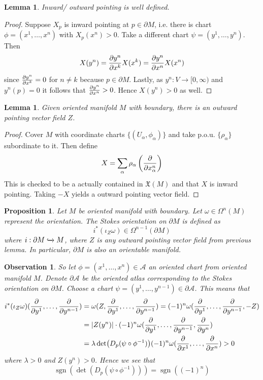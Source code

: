 \documentclass{article}
\numberwithin{theorem}{section}
\newtheorem{lemma}[theorem]{Lemma}
\newtheorem{proposition}[theorem]{Proposition}
\newtheorem{observation}{Observation}
\newcommand{\1}{\mathds{1}}
\DeclareMathOperator{\sgn}{sgn}
\begin{document}
\begin{lemma}
    Inward/ outward pointing is well defined. 
\end{lemma}
\begin{proof}
    Suppose $X_p$ is inward pointing at $p \in \partial M$, i.e. there is chart $\phi = (x^1, \dots, x^n)$ with $X_p(x^n) > 0$. Take a different chart $\psi = (y^1, \dots, y^n)$. Then 
    \[ X(y^n) = \pdv{y^n}{x^k} X(x^k) = \pdv{y^n}{x^n} X(x^n)  \]
    since $\pdv{y^n}{x^k} = 0 $ for $n\neq k$ because $p\in \partial M$. Lastly, as $y^n : V \to [0,\infty) $ and $y^n(p) = 0$ it follows that $\pdv{y^n}{x^n} > 0$. Hence $X(y^n) >0 $ as well. 
\end{proof}

\begin{lemma}
    Given oriented manifold $M$ with boundary, there is an outward pointing vector field $Z$. 
\end{lemma}
\begin{proof}
    Cover $M$ with coordinate charts $\{ (U_\alpha, \phi_\alpha) \}$ and take p.o.u. $\{\rho_\alpha \} $ subordinate to it. Then define 
    \[ X = \sum_{\alpha} \rho_\alpha \left( \pdv{}{x_\alpha^n} \right) \]
    This is checked to be a actually contained in $\mathfrak{X}(M)$ and that $X$ is inward pointing. Taking $-X$ yields a outward pointing vector field. 
\end{proof}

\begin{proposition}
    Let $M$ be oriented manifold with boundary. Let $\omega \in \Omega^n(M)$ represent the orientation. The 
    Stokes orientation on $\partial M$ is defined as 
    \[ i^*(\iota_Z\omega) \in \Omega^{n-1}(\partial M) \]
    where $i: \partial M \xhookrightarrow{} M$, where $Z$ is any outward pointing vector field from previous lemma. In particular, $\partial M$ is also an orientable manifold. 
\end{proposition}

\begin{observation}
    So let $\phi = (x^1, \dots, x^n) \in \mathcal{A}$ an oriented chart from oriented manifold $M$. Denote $\partial \mathcal{A}$ be the oriented atlas corresponding to the Stokes orientation on $\partial M$. Choose a chart $\psi = (y^1, \dots, y^{n-1}) \in \partial \mathcal{A}$. This means that 
    \begin{align*}
        i^*(\iota_Z\omega)( \pdv{}{y^1}, \dots, \pdv{}{y^{n-1}})  &= \omega(Z, \pdv{}{y^1}, \dots, \pdv{}{y^{n-1}})  = (-1)^n \omega(\pdv{}{y^1}, \dots, \pdv{}{y^{n-1}}, -Z) \\ 
        &= |Z(y^n)| \cdot (-1)^n \omega(\pdv{}{y^1}, \dots, \pdv{}{y^{n-1}}, \pdv{}{y^n}) \\
        &= \lambda \det(D_p(\psi \circ \phi^{-1})) (-1)^n \omega(\pdv{}{x^1}, \dots, \pdv{}{x^n})  > 0 
    \end{align*}
    where $\lambda > 0 $ and $Z(y^n) > 0 $. Hence we see that 
    \[ \sgn\left( \det( D_p(\psi \circ \phi^{-1}))  \right) = \sgn((-1)^n)  \]      

\end{observation}
\end{document}
